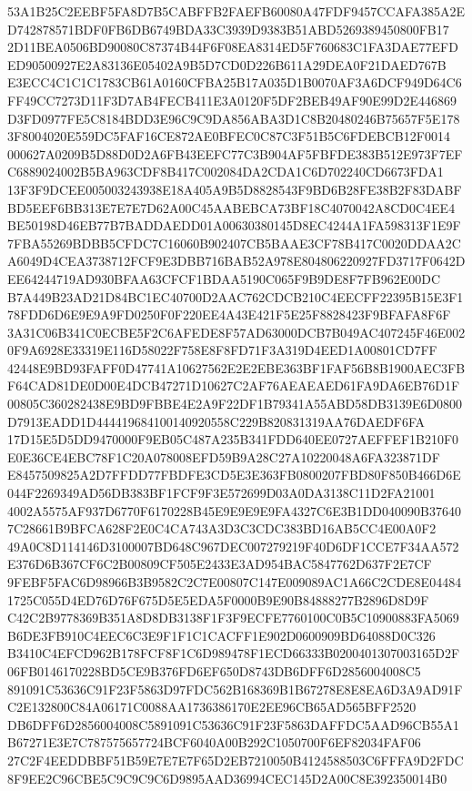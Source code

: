 \documentclass[UTF8,fontset=fandol,zihao=-4,a4paper]{ctexart}
\begin{document}
{{53A1B25C2EEBF5FA8D7B5CABFFB2FAEFB60080A47FDF9457CCAFA385A2ED742878571BDF0FB6DB6749BDA33C3939D9383B51ABD5269389450800FB17
2D11BEA0506BD90080C87374B44F6F08EA8314ED5F760683C1FA3DAE77EFDED90500927E2A83136E05402A9B5D7CD0D226B611A29DEA0F21DAED767B
E3ECC4C1C1C1783CB61A0160CFBA25B17A035D1B0070AF3A6DCF949D64C6FF49CC7273D11F3D7AB4FECB411E3A0120F5DF2BEB49AF90E99D2E446869
D3FD0977FE5C8184BDD3E96C9C9DA856ABA3D1C8B20480246B75657F5E1783F8004020E559DC5FAF16CE872AE0BFEC0C87C3F51B5C6FDEBCB12F0014
000627A0209B5D88D0D2A6FB43EEFC77C3B904AF5FBFDE383B512E973F7EFC6889024002B5BA963CDF8B417C002084DA2CDA1C6D702240CD6673FDA1
13F3F9DCEE005003243938E18A405A9B5D8828543F9BD6B28FE38B2F83DABFBD5EEF6BB313E7E7E7D62A00C45AABEBCA73BF18C4070042A8CD0C4EE4
BE50198D46EB77B7BADDAEDD01A00630380145D8EC4244A1FA598313F1E9F7FBA55269BDBB5CFDC7C16060B902407CB5BAAE3CF78B417C0020DDAA2C
A6049D4CEA3738712FCF9E3DBB716BAB52A978E804806220927FD3717F0642DEE64244719AD930BFAA63CFCF1BDAA5190C065F9B9DE8F7FB962E00DC
B7A449B23AD21D84BC1EC40700D2AAC762CDCB210C4EECFF22395B15E3F178FDD6D6E9E9A9FD0250F0F220EE4A43E421F5E25F8828423F9BFAFA8F6F
3A31C06B341C0ECBE5F2C6AFEDE8F57AD63000DCB7B049AC407245F46E0020F9A6928E33319E116D58022F758E8F8FD71F3A319D4EED1A00801CD7FF
42448E9BD93FAFF0D47741A10627562E2E2EBE363BF1FAF56B8B1900AEC3FBF64CAD81DE0D00E4DCB47271D10627C2AF76AEAEAED61FA9DA6EB76D1F
00805C360282438E9BD9FBBE4E2A9F22DF1B79341A55ABD58DB3139E6D0800D7913EADD1D444419684100140920558C229B820831319AA76DAEDF6FA
17D15E5D5DD9470000F9EB05C487A235B341FDD640EE0727AEFFEF1B210F0E0E36CE4EBC78F1C20A078008EFD59B9A28C27A10220048A6FA323871DF
E8457509825A2D7FFDD77FBDFE3CD5E3E363FB0800207FBD80F850B466D6E044F2269349AD56DB383BF1FCF9F3E572699D03A0DA3138C11D2FA21001
4002A5575AF937D6770F6170228B45E9E9E9E9FA4327C6E3B1DD040090B376407C28661B9BFCA628F2E0C4CA743A3D3C3CDC383BD16AB5CC4E00A0F2
49A0C8D114146D3100007BD648C967DEC007279219F40D6DF1CCE7F34AA572E376D6B367CF6C2B00809CF505E2433E3AD954BAC5847762D637F2E7CF
9FEBF5FAC6D98966B3B9582C2C7E00807C147E009089AC1A66C2CDE8E044841725C055D4ED76D76F675D5E5EDA5F0000B9E90B84888277B2896D8D9F
C42C2B9778369B351A8D8DB3138F1F3F9ECFE7760100C0B5C10900883FA5069B6DE3FB910C4EEC6C3E9F1F1C1CACFF1E902D0600909BD64088D0C326
B3410C4EFCD962B178FCF8F1C6D989478F1ECD66333B0200401307003165D2F06FB0146170228BD5CE9B376FD6EF650D8743DB6DFF6D2856004008C5
891091C53636C91F23F5863D97FDC562B168369B1B67278E8E8EA6D3A9AD91FC2E132800C84A06171C0088AA1736386170E2EE96CB65AD565BFF2520
DB6DFF6D2856004008C5891091C53636C91F23F5863DAFFDC5AAD96CB55A1B67271E3E7C787575657724BCF6040A00B292C1050700F6EF82034FAF06
27C2F4EEDDBBF51B59E7E7E7F65D2EB7210050B4124588503C6FFFA9D2FDC8F9EE2C96CBE5C9C9C9C6D9895AAD36994CEC145D2A00C8E392350014B0
}}
\end{document}
